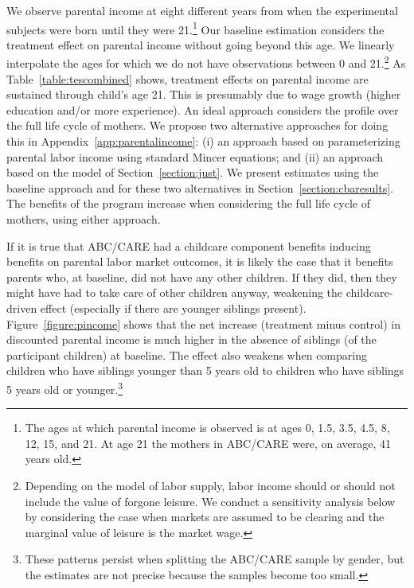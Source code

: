 We observe parental income at eight different years from when the experimental subjects were born until they were 21.\footnote{The ages at which parental income is observed is at ages 0, 1.5, 3.5, 4.5, 8, 12, 15, and 21. At age 21 the mothers in ABC/CARE were, on average, 41 years old.} Our baseline estimation considers the treatment effect on parental income without going beyond this age. We linearly interpolate the ages for which we do not have observations between 0 and 21.\footnote{Depending on the model of labor supply, labor income should or should not include the value of forgone leisure. We conduct a sensitivity analysis below by considering the case when markets are assumed to be clearing and the marginal value of leisure is the market wage.} As Table~\ref{table:tescombined} shows, treatment effects on parental income are sustained through child's age 21. This is presumably due to wage growth (higher education and/or more experience). An ideal approach considers the profile over the full life cycle of mothers. We propose two alternative approaches for doing this in Appendix~\ref{app:parentalincome}: (i) an approach based on parameterizing parental labor income using standard Mincer equations; and (ii) an approach based on the model of Section~\ref{section:just}. We present estimates using the baseline approach and for these two alternatives in Section~\ref{section:cbaresults}. The benefits of the program increase when considering the full life cycle of mothers, using either approach.

If it is true that ABC/CARE had a childcare component benefits inducing benefits on parental labor market outcomes, it is likely the case that it benefits parents who, at baseline, did not have any other children. If they did, then they might have had to take care of other children anyway, weakening the childcare-driven effect (especially if there are younger siblings present). Figure~\ref{figure:pincome} shows that the net increase (treatment minus control) in discounted parental income is much higher in the absence of siblings (of the participant children) at baseline. The effect also weakens when comparing children who have siblings younger than 5 years old to children who have siblings 5 years old or younger.\footnote{These patterns persist when splitting the ABC/CARE sample by gender, but the estimates are not precise because the samples become too small.}

